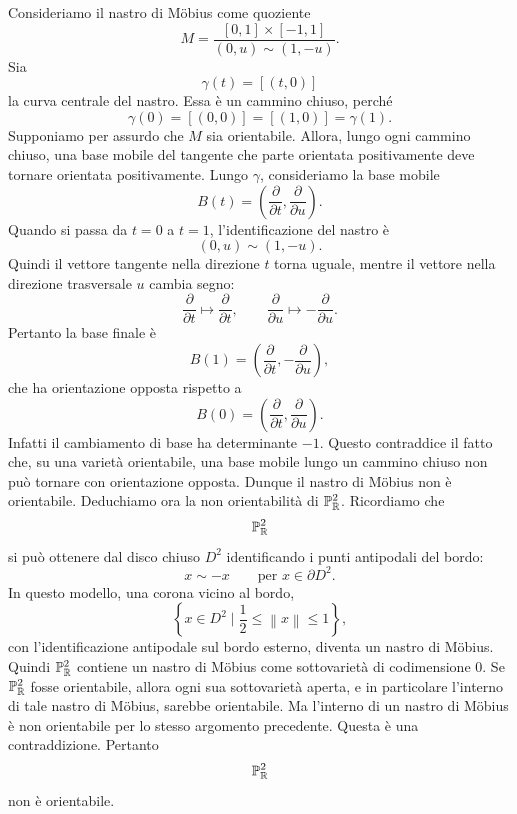 \documentclass[a4paper]{article}
\begin{document}
\begin{snippetproof}{}
    Consideriamo il nastro di Möbius come quoziente
    \[
        M=\frac{[0,1]\times[-1,1]}{(0,u)\sim(1,-u)}.
    \]
    Sia
    \[
        \gamma(t)=[(t,0)]
    \]
    la curva centrale del nastro. Essa è un cammino chiuso, perché
    \[
        \gamma(0)=[(0,0)]=[(1,0)]=\gamma(1).
    \]
    Supponiamo per assurdo che \(M\) sia orientabile. Allora, lungo ogni cammino chiuso, una base mobile del tangente che parte orientata positivamente deve tornare orientata positivamente.
    Lungo \(\gamma\), consideriamo la base mobile
    \[
        B(t)=\left(\frac{\partial}{\partial t},\frac{\partial}{\partial u}\right).
    \]
    Quando si passa da \(t=0\) a \(t=1\), l'identificazione del nastro è
    \[
        (0,u)\sim(1,-u).
    \]
    Quindi il vettore tangente nella direzione \(t\) torna uguale, mentre il vettore nella direzione trasversale \(u\) cambia segno:
    \[
        \frac{\partial}{\partial t}\longmapsto \frac{\partial}{\partial t},
        \qquad
        \frac{\partial}{\partial u}\longmapsto -\frac{\partial}{\partial u}.
    \]
    Pertanto la base finale è
    \[
        B(1)=\left(\frac{\partial}{\partial t},-\frac{\partial}{\partial u}\right),
    \]
    che ha orientazione opposta rispetto a
    \[
        B(0)=\left(\frac{\partial}{\partial t},\frac{\partial}{\partial u}\right).
    \]
    Infatti il cambiamento di base ha determinante \(-1\). Questo contraddice il fatto che, su una varietà orientabile, una base mobile lungo un cammino chiuso non può tornare con orientazione opposta. Dunque il nastro di Möbius non è orientabile.
    Deduchiamo ora la non orientabilità di \(\mathbb{P}^2_{\mathbb{R}}\). Ricordiamo che
    \[
        \mathbb{P}^2_{\mathbb{R}}
    \]
    si può ottenere dal disco chiuso \(D^2\) identificando i punti antipodali del bordo:
    \[
        x\sim -x
        \qquad
        \text{per }x\in\partial D^2.
    \]
    In questo modello, una corona vicino al bordo,
    \[
        \left\{x\in D^2\mid \frac12\leq \left\|x\right\|\leq 1\right\},
    \]
    con l'identificazione antipodale sul bordo esterno, diventa un nastro di Möbius. Quindi \(\mathbb{P}^2_{\mathbb{R}}\) contiene un nastro di Möbius come sottovarietà di codimensione \(0\).
    Se \(\mathbb{P}^2_{\mathbb{R}}\) fosse orientabile, allora ogni sua sottovarietà aperta, e in particolare l'interno di tale nastro di Möbius, sarebbe orientabile. Ma l'interno di un nastro di Möbius è non orientabile per lo stesso argomento precedente. Questa è una contraddizione.
    Pertanto
    \[
        \mathbb{P}^2_{\mathbb{R}}
    \]
    non è orientabile.
\end{snippetproof}
\end{document}

